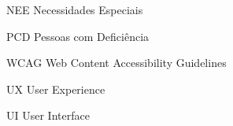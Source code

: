 
\begin{siglas}
    \item[NEE] Necessidades Especiais
    \item[PCD] Pessoas com Deficiência
    \item[WCAG] Web Content Accessibility Guidelines 
    \item[UX] User Experience
    \item[UI] User Interface
\end{siglas}

